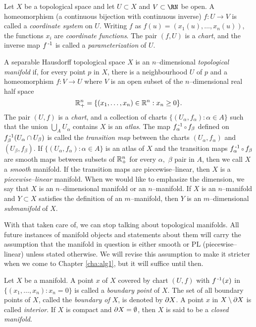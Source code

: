\begin{defn}
	\label{def:coordinates}
	Let $X$ be a topological space and let $U\subset X$ and $V\subset \RN$ be open.
	A homeomorphism (a continuous bijection with continuous inverse) $f:U\to V$ is called a \emph{coordinate system} on $U$.
	Writing $f$ as $f(u)=(x_1(u),\dots,x_n(u))$, the functions $x_i$ are \emph{coordinate functions}.
	The pair $(f,U)$ is a \emph{chart}, and the inverse map $f^{\,\text{-}1}$ is called a \emph{parameterization} of $U$.
\end{defn}


\begin{defn}
	\label{def:manifold}
	A separable Hausdorff topological space $X$ is an $n$--dimensional \emph{topological manifold} if, for every point $p$ in $X$, there is a neighbourhood $U$ of $p$ and a homeomorphism $f:V\to U$ where $V$ is an open subset of the $n$--dimensional real half space $$\mathbb{R}_+^n=\{(x_1,\dots,x_{n})\in\mathbb{R}^n : x_n\geq 0\}.$$
	The pair $(U,f)$ is a \emph{chart}, and a collection of charts $\{(U_\alpha,f_\alpha):\alpha\in A\}$ such that the union $\bigcup_A U_\alpha$ contains $X$ is an \emph{atlas}.
	The map $f_\alpha\inv\comp f_\beta$ defined on $f_\beta^{\,\text{-}1}(U_\alpha\cap U_\beta)$ is called the \emph{transition map} between the charts $(U_\alpha,f_\alpha)$ and $(U_\beta,f_\beta)$.
	If $\{(U_\alpha,f_\alpha):\alpha\in A\}$ is an atlas of $X$ and the transition maps $f_\alpha\inv\comp f_\beta$ are smooth maps between subsets of $\mathbb{R}_+^n$ for every $\alpha,$ $\beta$ pair in $A$, then we call $X$ a \emph{smooth} manifold.
	If the transition maps are piecewise--linear, then $X$ is a \emph{piecewise--linear} manifold.
	When we would like to emphasize the dimension, we say that $X$ is an $n$--dimensional manifold or an $n$--manifold.
	If $X$ is an $n$--manifold and $Y\subset X$ satisfies the definition of an $m$--manifold, then $Y$ is an $m$--dimensional \emph{submanifold} of $X$.
\end{defn}

With that taken care of, we can stop talking about topological manifolds.
All future instances of manifold objects and statements about them will carry the assumption that the manifold in question is either smooth or PL (piecewise--linear) unless stated otherwise.
We will revise this assumption to make it stricter when we come to Chapter \ref{cha:alg1}, but it will suffice until then.

\begin{defn}	
	\label{def:boundary}
	Let $X$ be a manifold.
	A point $x$ of $X$ covered by chart $(U,f)$ with $f^{\,\text{-}1}(x)$ in $\{(x_1,\dots,x_n): x_n = 0\}$ is called a \emph{boundary point} of $X$.
	The set of all boundary points of $X$, called the \emph{boundary of $X$}, is denoted by $\partial X$.
	A point $x$ in $X\setminus \partial X$ is called \emph{interior}.
	If $X$ is compact and $\partial X=\emptyset$, then $X$ is said to be a \emph{closed manifold}.
\end{defn}

